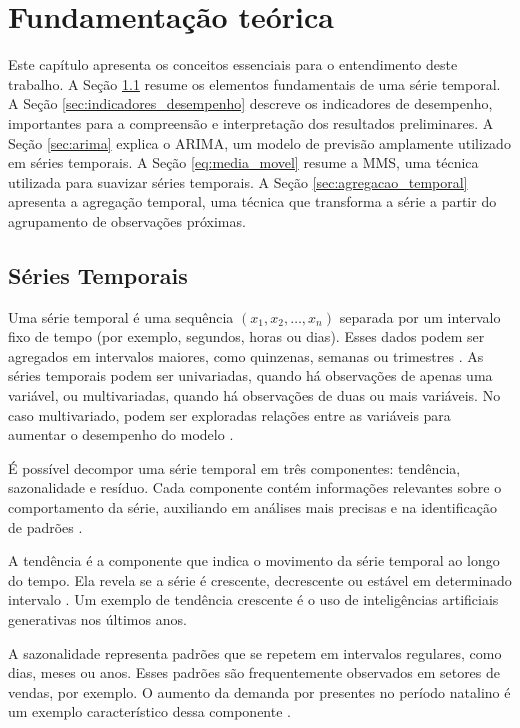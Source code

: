 \documentclass[12pt]{tcc}
\begin{document}
\chapter{Fundamentação teórica}
\label{sec:background}
\label{sec:fund_teorica}

Este capítulo apresenta os conceitos essenciais para o entendimento deste trabalho. A Seção \ref{sec:series_temporais} resume os elementos fundamentais de uma série temporal. A Seção \ref{sec:indicadores_desempenho} descreve os indicadores de desempenho, importantes para a compreensão e interpretação dos resultados preliminares. A Seção \ref{sec:arima} explica o \gls{ARIMA}, um modelo de previsão amplamente utilizado em séries temporais. A Seção \ref{eq:media_movel} resume a \gls{MMS}, uma técnica utilizada para suavizar séries temporais. A Seção \ref{sec:agregacao_temporal} apresenta a agregação temporal, uma técnica que transforma a série a partir do agrupamento de observações próximas.

\section{Séries Temporais}
\label{sec:series_temporais}

Uma série temporal é uma sequência $(x_1, x_2, \dots, x_n)$ separada por um intervalo fixo de tempo (por exemplo, segundos, horas ou dias). Esses dados podem ser agregados em intervalos maiores, como quinzenas, semanas ou trimestres \citep{gujarati_basic_2003}. As séries temporais podem ser univariadas, quando há observações de apenas uma variável, ou multivariadas, quando há observações de duas ou mais variáveis. No caso multivariado, podem ser exploradas relações entre as variáveis para aumentar o desempenho do modelo \citep{silvestrini2008temporal}. 

É possível decompor uma série temporal em três componentes: tendência, sazonalidade e resíduo. Cada componente contém informações relevantes sobre o comportamento da série, auxiliando em análises mais precisas e na identificação de padrões \citep{ogasawara_event_2025}.

A tendência é a componente que indica o movimento da série temporal ao longo do tempo. Ela revela se a série é crescente, decrescente ou estável em determinado intervalo \citep{ogasawara_event_2025}. Um exemplo de tendência crescente é o uso de inteligências artificiais generativas nos últimos anos.

A sazonalidade representa padrões que se repetem em intervalos regulares, como dias, meses ou anos. Esses padrões são frequentemente observados em setores de vendas, por exemplo. O aumento da demanda por presentes no período natalino é um exemplo característico dessa componente \citep{ogasawara_event_2025, zellner_seasonal_1978}.
\end{document}
